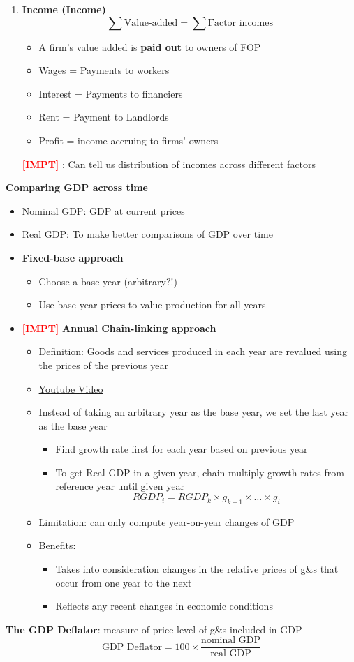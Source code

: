 \documentclass{article}
\newcommand{\impt}[0]{\textcolor{red}{\textbf{[IMPT] }}}
\begin{document}
\begin{multicols}{2}
\begin{enumerate}
	\item \textbf{Income (Income)}
	$$\sum \text{Value-added} = \sum \text{Factor incomes}$$
	\begin{itemize}
		\item A firm's value added is \textbf{paid out} to owners of FOP
		\item Wages = Payments to workers
		\item Interest = Payments to financiers
		\item Rent = Payment to Landlords
		\item Profit = income accruing to firms' owners
	\end{itemize}
\impt: Can tell us distribution of incomes across different factors
\end{enumerate}
\textbf{Comparing GDP across time}
\begin{itemize}
	\item Nominal GDP: GDP at current prices
	\item Real GDP: To make better comparisons of GDP over time
	\item \textbf{Fixed-base approach}
	\begin{itemize}
		\item Choose a base year (arbitrary?!)
		\item Use base year prices to value production for all years
	\end{itemize}
    \item \impt \textbf{Annual Chain-linking approach}
    \begin{itemize}
    	\item \underline{Definition}: Goods and services produced in each year are revalued using the prices of the previous year
    	\item \href{https://www.youtube.com/watch?v=hgbkKn883-U}{Youtube Video}
    	\item Instead of taking an arbitrary year as the base year, we set the last year as the base year
    	\begin{itemize}
    		\item Find growth rate first for each year based on previous year
    		\item To get Real GDP in a given year, chain multiply growth rates from reference year until given year
    		$$RGDP_{i} = RGDP_{k} \times g_{k+1} \times \dots \times g_i$$
    	\end{itemize}
    	\item Limitation: can only compute year-on-year changes of GDP
    	\item Benefits:
    	\begin{itemize}
    		\item Takes into consideration changes in the relative prices of g\&s that occur from one year to the next
    		\item Reflects any recent changes in economic conditions
    	\end{itemize}
    \end{itemize}
\end{itemize}
\textbf{The GDP Deflator}: measure of price level of g\&s included in GDP
$$\text{GDP Deflator} = 100 \times \frac{\text{nominal GDP}}{\text{real GDP}}$$


\end{multicols}
\end{document}

